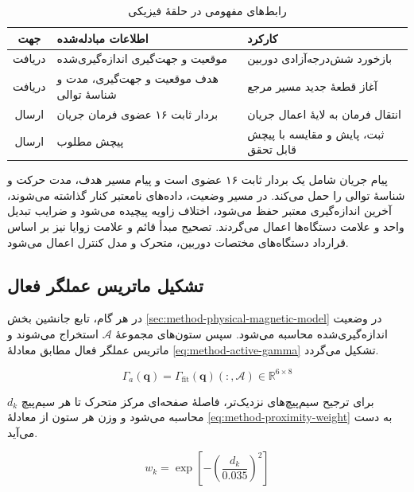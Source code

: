 \begin{table}[!htbp]
	\centering
	\scriptsize
	\caption{رابط‌های مفهومی  در حلقهٔ فیزیکی}
	\label{tab:method-ros-interfaces}
	\begin{tabular}{|c|p{}|p{}|}
		\hline
		\textbf{جهت} & \textbf{اطلاعات مبادله‌شده} & \textbf{کارکرد}\\ \hline
		دریافت & موقعیت و جهت‌گیری اندازه‌گیری‌شده & بازخورد شش‌درجه‌آزادی دوربین\\ \hline
		دریافت & هدف موقعیت و جهت‌گیری، مدت و شناسهٔ توالی & آغاز قطعهٔ جدید مسیر مرجع\\ \hline
		ارسال & بردار ثابت ۱۶ عضوی فرمان جریان & انتقال فرمان به لایهٔ اعمال جریان\\ \hline
		ارسال & پیچش مطلوب & ثبت، پایش و مقایسه با پیچش قابل تحقق\\ \hline
	\end{tabular}
\end{table}

پیام جریان شامل یک بردار ثابت ۱۶ عضوی است و پیام مسیر هدف، مدت حرکت و شناسهٔ توالی را حمل می‌کند. در مسیر وضعیت، داده‌های نامعتبر کنار گذاشته می‌شوند، آخرین اندازه‌گیری معتبر حفظ می‌شود، اختلاف زاویه پیچیده می‌شود و ضرایب تبدیل واحد و علامت دستگاه‌ها اعمال می‌گردند. تصحیح مبدأ قائم و علامت زوایا نیز بر اساس قرارداد دستگاه‌های مختصات دوربین، متحرک و مدل کنترل اعمال می‌شود.

\subsection{تشکیل ماتریس عملگر فعال}

در هر گام، تابع جانشین بخش \ref{sec:method-physical-magnetic-model} در وضعیت اندازه‌گیری‌شده محاسبه می‌شود. سپس ستون‌های مجموعهٔ $\mathcal A$ استخراج می‌شوند و ماتریس عملگر فعال مطابق معادلهٔ \ref{eq:method-active-gamma} تشکیل می‌گردد.

\begin{equation}
	\Gamma_a(\mathbf q)=\Gamma_{\mathrm{fit}}(\mathbf q)(:,\mathcal A)\in\mathbb R^{6\times8}
	\label{eq:method-active-gamma}
\end{equation}

برای ترجیح سیم‌پیچ‌های نزدیک‌تر، فاصلهٔ صفحه‌ای مرکز متحرک تا هر سیم‌پیچ $d_k$ محاسبه می‌شود و وزن هر ستون از معادلهٔ \ref{eq:method-proximity-weight} به دست می‌آید.

\begin{equation}
	w_k=\exp\left[-\left(\frac{d_k}{0.035}\right)^2\right]
	\label{eq:method-proximity-weight}
\end{equation}

